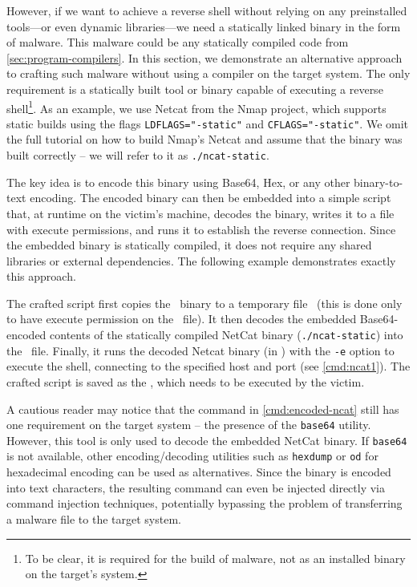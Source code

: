 However, if we want to achieve a reverse shell without relying on any preinstalled tools—or even dynamic libraries—we need a statically linked binary in the form of malware. This malware could be any statically compiled code from \cref{sec:program-compilers}. In this section, we demonstrate an alternative approach to crafting such malware without using a compiler on the target system. The only requirement is a statically built tool or binary capable of executing a reverse shell\footnote{To be clear, it is required for the build of malware, not as an installed binary on the target's system.}. As an example, we use Netcat from the Nmap project, which supports static builds using the flags \texttt{LDFLAGS="-static"} and \texttt{CFLAGS="-static"}. We omit the full tutorial on how to build Nmap's Netcat and assume that the binary was built correctly -- we will refer to it as \texttt{./ncat-static}.

The key idea is to encode this binary using Base64, Hex, or any other binary-to-text encoding. The encoded binary can then be embedded into a simple script that, at runtime on the victim's machine, decodes the binary, writes it to a file with execute permissions, and runs it to establish the reverse connection. Since the embedded binary is statically compiled, it does not require any shared libraries or external dependencies.
The following example demonstrates exactly this approach.


The crafted script first copies the \shell\ binary to a temporary file \tmp\ (this is done only to have execute permission on the \tmp\ file). It then decodes the embedded Base64-encoded contents of the statically compiled NetCat binary (\texttt{./ncat-static}) into the \tmp\ file. Finally, it runs the decoded Netcat binary (in \tmp) with the \texttt{-e} option to execute the shell, connecting to the specified host and port (see \cref{cmd:ncat1}). The crafted script is saved as the \script, which needs to be executed by the victim.

A cautious reader may notice that the command in \cref{cmd:encoded-ncat} still has one requirement on the target system -- the presence of the \texttt{base64} utility. However, this tool is only used to decode the embedded NetCat binary. If \texttt{base64} is not available, other encoding/decoding utilities such as \texttt{hexdump} or \texttt{od} for hexadecimal encoding can be used as alternatives. Since the binary is encoded into text characters, the resulting command can even be injected directly via command injection techniques, potentially bypassing the problem of transferring a malware file to the target system.
